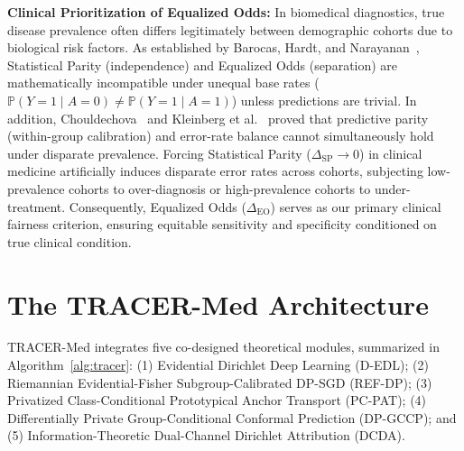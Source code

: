 \documentclass[3p,12pt]{elsarticle}
\theoremstyle{plain}
\theoremstyle{definition}
\begin{document}
\noindent \textbf{Clinical Prioritization of Equalized Odds:} In biomedical diagnostics, true disease prevalence often differs legitimately between demographic cohorts due to biological risk factors. As established by Barocas, Hardt, and Narayanan~\cite{barocas2019fairness}, Statistical Parity (independence) and Equalized Odds (separation) are mathematically incompatible under unequal base rates ($\mathbb{P}(Y = 1 \mid A = 0) \neq \mathbb{P}(Y = 1 \mid A = 1)$) unless predictions are trivial. In addition, Chouldechova~\cite{chouldechova2017fair} and Kleinberg et al.~\cite{kleinberg2016inherent} proved that predictive parity (within-group calibration) and error-rate balance cannot simultaneously hold under disparate prevalence. Forcing Statistical Parity ($\Delta_{\text{SP}} \to 0$) in clinical medicine artificially induces disparate error rates across cohorts, subjecting low-prevalence cohorts to over-diagnosis or high-prevalence cohorts to under-treatment. Consequently, Equalized Odds ($\Delta_{\text{EO}}$) serves as our primary clinical fairness criterion, ensuring equitable sensitivity and specificity conditioned on true clinical condition.

\section{The TRACER-Med Architecture}
\label{sec:method}

TRACER-Med integrates five co-designed theoretical modules, summarized in Algorithm~\ref{alg:tracer}: (1) Evidential Dirichlet Deep Learning (D-EDL); (2) Riemannian Evidential-Fisher Subgroup-Calibrated DP-SGD (REF-DP); (3) Privatized Class-Conditional Prototypical Anchor Transport (PC-PAT); (4) Differentially Private Group-Conditional Conformal Prediction (DP-GCCP); and (5) Information-Theoretic Dual-Channel Dirichlet Attribution (DCDA).
\end{document}
